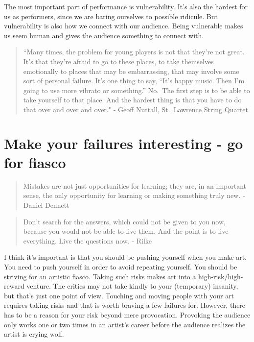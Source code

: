 \documentclass[
]{book}
\begin{document}
The most important part of performance is vulnerability. It's also the hardest for us as performers, since we are baring ourselves to possible ridicule. But vulnerability is also how we connect with our audience. Being vulnerable makes us seem human and gives the audience something to connect with.

\begin{quote}
``Many times, the problem for young players is not that they're not great.
It's that they're afraid to go to these places, to take themselves
emotionally to places that may be embarrassing, that may involve
some sort of personal failure. It's one thing to say, ``It's happy music.
Then I'm going to use more vibrato or something.'' No.~The first step
is to be able to take yourself to that place. And the hardest thing is
that you have to do that over and over and over."
- Geoff Nuttall, St.~Lawrence String Quartet
\end{quote}

\hypertarget{make-your-failures-interesting---go-for-fiasco}{%
\section{Make your failures interesting - go for fiasco}\label{make-your-failures-interesting---go-for-fiasco}}

\begin{quote}
Mistakes are not just opportunities for learning; they are, in an important sense,
the only opportunity for learning or making something truly new. - Daniel Dennett
\end{quote}

\begin{quote}
Don't search for the answers, which could not be given to you now, because you
would not be able to live them. And the point is to live everything. Live the questions now. - Rilke
\end{quote}

I think it's important is that you should be pushing yourself when you make art. You need to push yourself in order to avoid repeating yourself. You should be striving for an artistic fiasco. Taking such risks makes art into a high-risk/high-reward venture. The critics may not take kindly to your (temporary) insanity, but that's just one point of view. Touching and moving people with your art requires taking risks and that is worth braving a few failures for. However, there has to be a reason for your risk beyond mere provocation. Provoking the audience only works one or two times in an artist's career before the audience realizes the artist is crying wolf.
\end{document}
